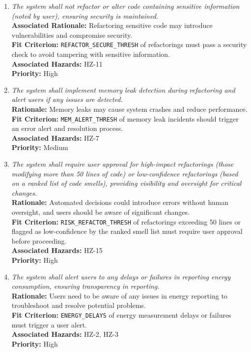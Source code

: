 \documentclass{article}
\begin{document}
\begin{enumerate}[label=SCR \arabic*., wide=0pt, leftmargin=*]
    \item \emph{The system shall not refactor or alter code containing sensitive information (noted by user), ensuring security is maintained.}\\
    {\bf Associated Rationale:} Refactoring sensitive code may introduce vulnerabilities and compromise security.\\
    {\bf Fit Criterion:} \texttt{REFACTOR\_SECURE\_THRESH} of refactorings must pass a security check to avoid tampering with sensitive information.\\
    {\bf Associated Hazards:} HZ-11\\
    {\bf Priority:} High

    \item \emph{The system shall implement memory leak detection during refactoring and alert users if any issues are detected.}\\
    {\bf Rationale:} Memory leaks may cause system crashes and reduce performance.\\
    {\bf Fit Criterion:} \texttt{MEM\_ALERT\_THRESH} of memory leak incidents should trigger an error alert and resolution process.\\
    {\bf Associated Hazards:} HZ-7\\
    {\bf Priority:} Medium

    \item \emph{The system shall require user approval for high-impact refactorings (those modifying more than 50 lines of code) or low-confidence refactorings (based on a ranked list of code smells), providing visibility and oversight for critical changes.}\\
    {\bf Rationale:} Automated decisions could introduce errors without human oversight, and users should be aware of significant changes.\\
    {\bf Fit Criterion:} \texttt{RISK\_REFACTOR\_THRESH} of refactorings exceeding 50 lines or flagged as low-confidence by the ranked smell list must require user approval before proceeding.\\
    {\bf Associated Hazards:} HZ-15\\
    {\bf Priority:} High

    \item \emph{The system shall alert users to any delays or failures in reporting energy consumption, ensuring transparency in reporting.}\\
    {\bf Rationale:} Users need to be aware of any issues in energy reporting to troubleshoot and resolve potential problems.\\
    {\bf Fit Criterion:} \texttt{ENERGY\_DELAYS} of energy measurement delays or failures must trigger a user alert.\\
    {\bf Associated Hazards:} HZ-2, HZ-3\\
    {\bf Priority:} High


\end{enumerate}
\end{document}
